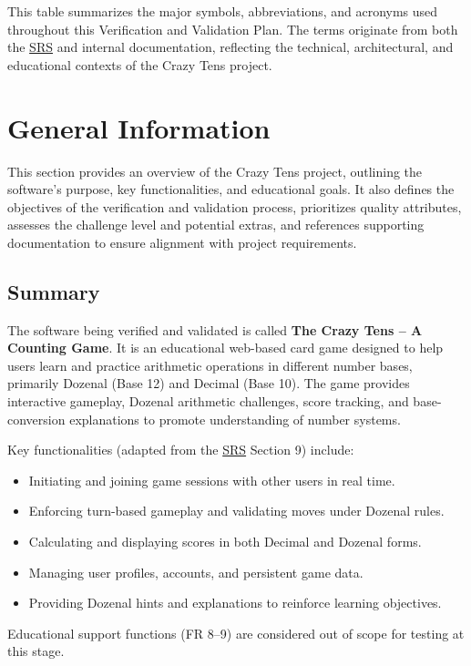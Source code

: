 \documentclass[12pt, titlepage]{article}
\begin{document}
\noindent
This table summarizes the major symbols, abbreviations, and acronyms used throughout this Verification and Validation Plan. The terms originate from both the \href{../SRS/SRS.pdf}{SRS} and internal documentation, reflecting the technical, architectural, and educational contexts of the Crazy Tens project.

\newpage

\section{General Information}
This section provides an overview of the Crazy Tens project, outlining the software's purpose, key functionalities, and educational goals. It also defines the objectives of the verification and validation process, prioritizes quality attributes, assesses the challenge level and potential extras, and references supporting documentation to ensure alignment with project requirements.

\subsection{Summary}
The software being verified and validated is called \textbf{The Crazy Tens – A Counting Game}. It is an educational web-based card game designed to help users learn and practice arithmetic operations in different number bases, primarily Dozenal (Base 12) and Decimal (Base 10). The game provides interactive gameplay, Dozenal arithmetic challenges, score tracking, and base-conversion explanations to promote understanding of number systems.  

Key functionalities (adapted from the \href{../SRS/SRS.pdf}{SRS} Section 9) include:
\begin{itemize}
    \item Initiating and joining game sessions with other users in real time.
    \item Enforcing turn-based gameplay and validating moves under Dozenal rules.
    \item Calculating and displaying scores in both Decimal and Dozenal forms.
    \item Managing user profiles, accounts, and persistent game data.
    \item Providing Dozenal hints and explanations to reinforce learning objectives.
\end{itemize}
Educational support functions (FR 8–9) are considered out of scope for testing at this stage.
\end{document}
